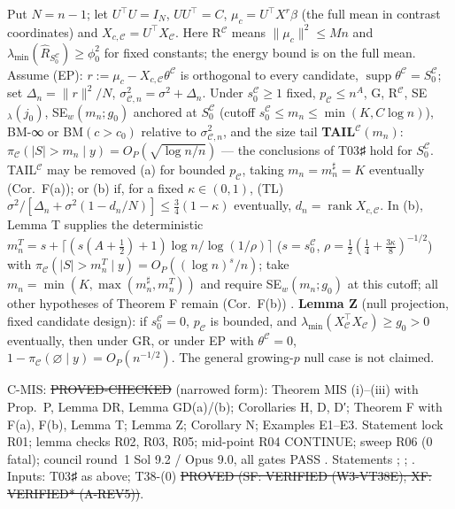 \begin{theorem}\label{thm:F}
Put $N=n-1$; let $U^\top U=I_N$, $UU^\top=C$, $\mu_c=U^\top X^r\beta$ (the full mean in contrast coordinates) and $X_{c,\mathcal C}=U^\top X_{\mathcal C}$. Here R$^{\mathcal C}$ means $\|\mu_c\|^2\le Mn$ and $\lambda_{\min}(\hat{R}_{S_0^{\mathcal C}})\ge\phi_0^2$ for fixed constants; the energy bound is on the full mean. Assume (EP): $r:=\mu_c-X_{c,\mathcal C}\theta^{\mathcal C}$ is orthogonal to every candidate, $\operatorname{supp}\theta^{\mathcal C}=S_0^{\mathcal C}$; set $\Delta_n=\|r\|^2/N$, $\sigma^2_{\mathcal C,n}=\sigma^2+\Delta_n$. Under $s_0^{\mathcal C}\ge1$ fixed, $p_{\mathcal C}\le n^A$, G, R$^{\mathcal C}$, SE$_\lambda(j_0)$, SE$_w(m_n;g_0)$ anchored at $S_0^{\mathcal C}$ (cutoff $s_0^{\mathcal C}\le m_n\le\min(K,C\log n)$), BM-∞ or BM$(c>c_0)$ relative to $\sigma^2_{\mathcal C,n}$, and the size tail \textbf{TAIL$^{\mathcal C}(m_n)$}: $\pi_{\mathcal C}(|S|>m_n\mid y)=O_P(\sqrt{\log n/n})$ — the conclusions of T03♯ hold for $S_0^{\mathcal C}$. TAIL$^{\mathcal C}$ may be removed (a) for bounded $p_{\mathcal C}$, taking $m_n=m_n^\sharp=K$ eventually (Cor.~F(a)); or (b) if, for a fixed $\kappa\in(0,1)$, (TL) $\sigma^2/[\Delta_n+\sigma^2(1-d_n/N)]\le\frac34(1-\kappa)$ eventually, $d_n=\operatorname{rank}X_{c,\mathcal C}$. In (b), Lemma T supplies the deterministic $m_n^T=s+\lceil(s(A+\frac12)+1)\log n/\log(1/\rho)\rceil$ ($s=s_0^{\mathcal C}$, $\rho=\frac12(\frac14+\frac{3\kappa}8)^{-1/2}$) with $\pi_{\mathcal C}(|S|>m_n^T\mid y)=O_P((\log n)^{s}/n)$; take $m_n=\min(K,\max(m_n^\sharp,m_n^T))$ and require SE$_w(m_n;g_0)$ at this cutoff; all other hypotheses of Theorem F remain (Cor.~F(b)) . \textbf{Lemma Z} (null projection, fixed candidate design): if $s_0^{\mathcal C}=0$, $p_{\mathcal C}$ is bounded, and $\lambda_{\min}(X_{\mathcal C}^{\top}X_{\mathcal C})\ge g_0>0$ eventually, then under GR, or under EP with $\theta^{\mathcal C}=0$, $1-\pi_{\mathcal C}(\varnothing\mid y)=O_P(n^{-1/2})$. The general growing-$p$ null case is not claimed.
\end{theorem}
\begin{statusbox}
C-MIS: \st{PROVED-CHECKED} (narrowed form): Theorem MIS (i)--(iii) with Prop.~P, Lemma DR, Lemma GD(a)/(b); Corollaries H, D, D′; Theorem F with F(a), F(b), Lemma T; Lemma Z; Corollary N; Examples E1--E3. Statement lock R01; lemma checks R02, R03, R05; mid-point R04 CONTINUE; sweep R06 (0 fatal); council round~1 Sol 9.2 / Opus 9.0, all gates PASS . Statements ; ; . Inputs: T03♯ as above; T38-(0) \st{PROVED (SF: VERIFIED (W3-VT38E); XF: VERIFIED* (A-REV5))}.
\end{statusbox}
